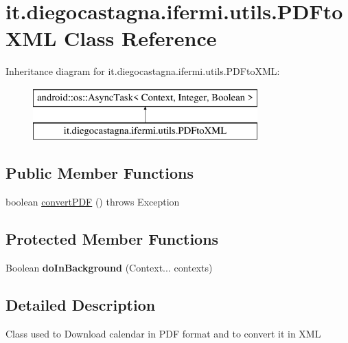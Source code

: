 \hypertarget{classit_1_1diegocastagna_1_1ifermi_1_1utils_1_1_p_d_fto_x_m_l}{}\section{it.\+diegocastagna.\+ifermi.\+utils.\+P\+D\+Fto\+X\+ML Class Reference}
\label{classit_1_1diegocastagna_1_1ifermi_1_1utils_1_1_p_d_fto_x_m_l}
Inheritance diagram for it.\+diegocastagna.\+ifermi.\+utils.\+P\+D\+Fto\+X\+ML\+:\begin{figure}[H]
\begin{center}
\leavevmode
\includegraphics[height=2.000000cm]{classit_1_1diegocastagna_1_1ifermi_1_1utils_1_1_p_d_fto_x_m_l}
\end{center}
\end{figure}
\subsection*{Public Member Functions}
\begin{DoxyCompactItemize}
\item 
boolean \mbox{\hyperlink{classit_1_1diegocastagna_1_1ifermi_1_1utils_1_1_p_d_fto_x_m_l_a9fe676675c1f47410dea3f0a12522cf2}{convert\+P\+DF}} ()  throws Exception 
\end{DoxyCompactItemize}
\subsection*{Protected Member Functions}
\begin{DoxyCompactItemize}
\item 
\mbox{\label{classit_1_1diegocastagna_1_1ifermi_1_1utils_1_1_p_d_fto_x_m_l_af8e6e16425b6139f6ee5132f44855c86}} 
Boolean {\bfseries do\+In\+Background} (Context... contexts)
\end{DoxyCompactItemize}


\subsection{Detailed Description}
Class used to Download calendar in P\+DF format and to convert it in X\+ML 

